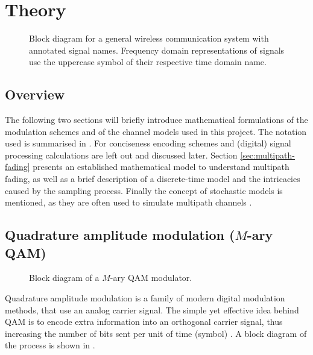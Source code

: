 
\chapter{Theory}

\begin{figure}
	\centering
	\resizebox{\linewidth}{!}{
		
	}
	\caption{
		Block diagram for a general wireless communication system with annotated signal names. Frequency domain representations of signals use the uppercase symbol of their respective time domain name.
		\label{fig:notation}
	}
\end{figure}

\section{Overview}

The following two sections will briefly introduce mathematical formulations of the modulation schemes and of the channel models used in this project. The notation used is summarised in . For conciseness encoding schemes and (digital) signal processing calculations are left out and discussed later.  Section \ref{sec:multipath-fading} presents an established mathematical model to understand multipath fading, as well as a brief description of a discrete-time model and the intricacies caused by the sampling process. Finally the concept of stochastic models is mentioned, as they are often used to simulate multipath channels \cite{Messier,Mathis}.


\section{Quadrature amplitude modulation (\(M\)-ary QAM)}

\begin{figure}
	\centering
	\resizebox{\linewidth}{!}{
		
	}
	\caption{
		Block diagram of a \(M\)-ary QAM modulator.
		\label{fig:quadrature-modulation}
	}
\end{figure}

Quadrature amplitude modulation is a family of modern digital modulation methods, that use an analog carrier signal. The simple yet effective idea behind QAM is to encode extra information into an orthogonal carrier signal, thus increasing the number of bits sent per unit of time (symbol) \cite{Gallager,Kneubuehler,Mathis,Hsu}. A block diagram of the process is shown in .

